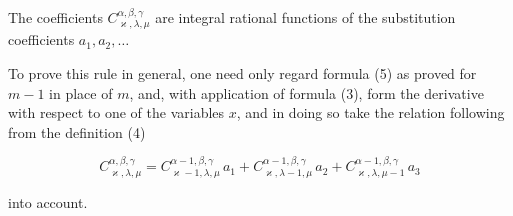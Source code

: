 
The coefficients $C^{\alpha, \beta, \gamma}_{\varkappa, \lambda, \mu}$ are integral rational functions of the substitution coefficients $a_1, a_2, \ldots$

To prove this rule in general, one need only regard formula (5) as proved for $m - 1$ in place of $m$, and, with application of formula (3), form the derivative with respect to one of the variables $x$, and in doing so take the relation following from the definition (4)

\[
C^{\alpha, \beta, \gamma}_{\varkappa, \lambda, \mu} = C^{\alpha - 1, \beta, \gamma}_{\varkappa - 1, \lambda, \mu}\, a_1 + C^{\alpha - 1, \beta, \gamma}_{\varkappa, \lambda - 1, \mu}\, a_2 + C^{\alpha - 1, \beta, \gamma}_{\varkappa, \lambda, \mu - 1}\, a_3
\]

into account.
